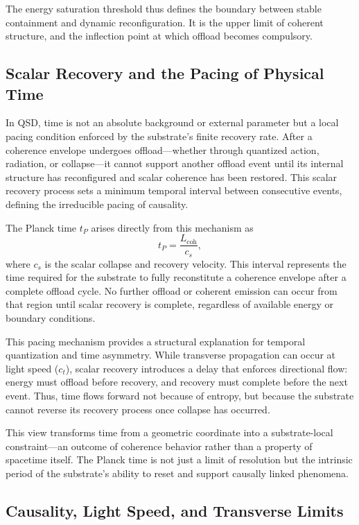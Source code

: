 \documentclass[entropy,article,submit,pdftex,oneauthor]{Definitions/mdpi}
\begin{document}
The energy saturation threshold thus defines the boundary between stable containment and dynamic reconfiguration. It is the upper limit of coherent structure, and the inflection point at which offload becomes compulsory.
\subsection{Scalar Recovery and the Pacing of Physical Time}

In QSD, time is not an absolute background or external parameter but a local pacing condition enforced by the substrate’s finite recovery rate. After a coherence envelope undergoes offload—whether through quantized action, radiation, or collapse—it cannot support another offload event until its internal structure has reconfigured and scalar coherence has been restored. This scalar recovery process sets a minimum temporal interval between consecutive events, defining the irreducible pacing of causality.

The Planck time \texorpdfstring{\( t_P \)}{tP} arises directly from this mechanism as
\[
t_P = \frac{L_{\text{coh}}}{c_s},
\]
where \texorpdfstring{\( c_s \)}{cs} is the scalar collapse and recovery velocity. This interval represents the time required for the substrate to fully reconstitute a coherence envelope after a complete offload cycle. No further offload or coherent emission can occur from that region until scalar recovery is complete, regardless of available energy or boundary conditions.

This pacing mechanism provides a structural explanation for temporal quantization and time asymmetry. While transverse propagation can occur at light speed (\texorpdfstring{\( c_t \)}{ct}), scalar recovery introduces a delay that enforces directional flow: energy must offload before recovery, and recovery must complete before the next event. Thus, time flows forward not because of entropy, but because the substrate cannot reverse its recovery process once collapse has occurred.

This view transforms time from a geometric coordinate into a substrate-local constraint—an outcome of coherence behavior rather than a property of spacetime itself. The Planck time is not just a limit of resolution but the intrinsic period of the substrate’s ability to reset and support causally linked phenomena.
\subsection{Causality, Light Speed, and Transverse Limits}
\end{document}
